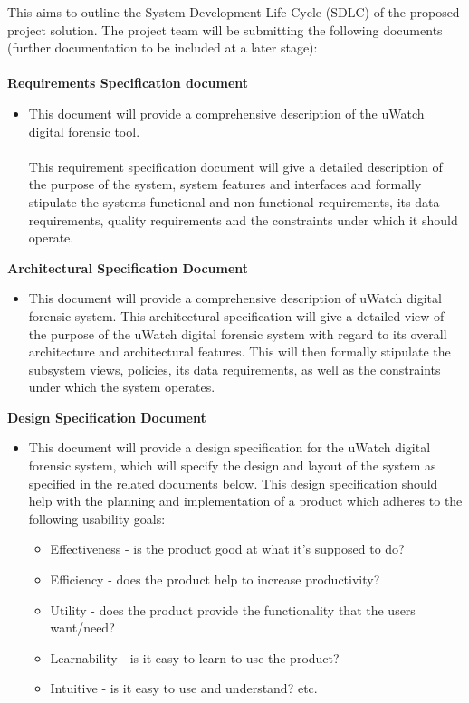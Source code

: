 This aims to outline the System Development Life-Cycle (SDLC) of the
proposed project solution.
The project team will be submitting the following documents (further documentation to be included at a later stage):
\newline \\ \\
\textbf{Requirements Specification document}
    \begin{itemize}
         \item This document will provide a comprehensive description of the uWatch digital forensic tool.\\ \\ This requirement specification document will give a detailed description of the purpose of the system, system features and interfaces and formally stipulate the systems functional and non-functional requirements, its data requirements, quality requirements and the constraints under which it should operate.
    \end{itemize}

\newline
\textbf{Architectural Specification Document}

    \begin{itemize}
         \item This document will provide a comprehensive description of uWatch digital forensic system. This architectural specification will give a detailed view of the purpose of the uWatch digital forensic system with regard to its overall architecture and architectural features. This will then formally stipulate the subsystem views, policies, its data requirements, as well as the constraints under which the system operates.
    \end{itemize}
    
\newline

\textbf{Design Specification Document}
    \begin{itemize}
         \item This document will provide a design specification for the uWatch digital forensic system, which will
specify the design and layout of the system as specified in the related documents below. This design specification should help with the planning and implementation of a product which adheres to the following usability goals:
\newline
\begin{itemize}
        \item  Effectiveness - is the product good at what it’s supposed to do?
        \item  Efficiency - does the product help to increase productivity?
        \item  Utility - does the product provide the functionality that the users
        want/need?
        \item  Learnability - is it easy to learn to use the product?
        \item  Intuitive - is it easy to use and understand? etc.
\end{itemize}
     \end{itemize}
     
